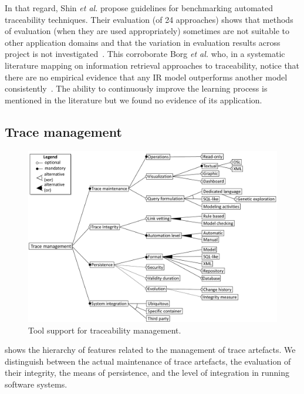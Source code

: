 In that regard, Shin \textit{et al.} propose guidelines for benchmarking automated traceability techniques. Their evaluation (of 24 approaches) shows that methods of evaluation (when they are used appropriately) sometimes are not suitable to other application domains and that the variation in evaluation results across project is not investigated~\cite{shin2015-guidelines-benchmark-auto-traceability}. This corroborate Borg \textit{et al.} who, in a systematic literature mapping on information retrieval approaches to traceability, notice that there are no empirical evidence that any IR model outperforms another model consistently~\cite{borg2014-SmS-IR-for-traceability}. The ability to continuously improve the learning process is mentioned in the literature but we found no evidence of its application. 

\subsection{Trace management}
\label{sec:fm:toolsupport}
\begin{figure}[h]
	\centering
	\includegraphics[width=.8\linewidth]{images/fm-toolsupport}
	\caption{Tool support for traceability management.}
	\label{fig:fm:management}
\end{figure}

 shows the hierarchy of features related to the management of trace artefacts. We distinguish between the actual maintenance of trace artefacts, the evaluation of their integrity, the means of persistence, and the level of integration in running software systems.

